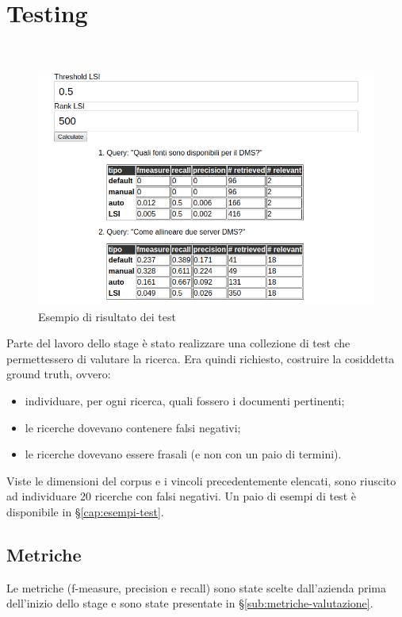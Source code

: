 \chapter{Testing}
\label{cap:testing}
\\
\begin{center}
    \begin{figure}
        \includegraphics[scale=0.5]{immagini/ir_eval.png}
        \caption{Esempio di risultato dei test
        \label{fig:esecuzioneTest}}
     \end{figure}
\end{center} 
     Parte del lavoro dello stage è stato realizzare una collezione di test che permettessero di valutare la ricerca. Era quindi richiesto, costruire la cosiddetta ground truth, ovvero:
    \begin{itemize}
        \item individuare, per ogni ricerca, quali fossero i documenti pertinenti;
        \item le ricerche dovevano contenere falsi negativi;
        \item le ricerche dovevano essere frasali (e non con un paio di termini).
    \end{itemize}
    Viste le dimensioni del \gls{corpus} e i vincoli precedentemente elencati, sono riuscito ad individuare 20 ricerche con falsi negativi. Un paio di esempi di test è disponibile in §\ref{cap:esempi-test}.

    \section{Metriche}
    Le metriche (f-measure, precision e recall) sono state scelte dall'azienda prima dell'inizio dello stage e sono state presentate in §\ref{sub:metriche-valutazione}.

